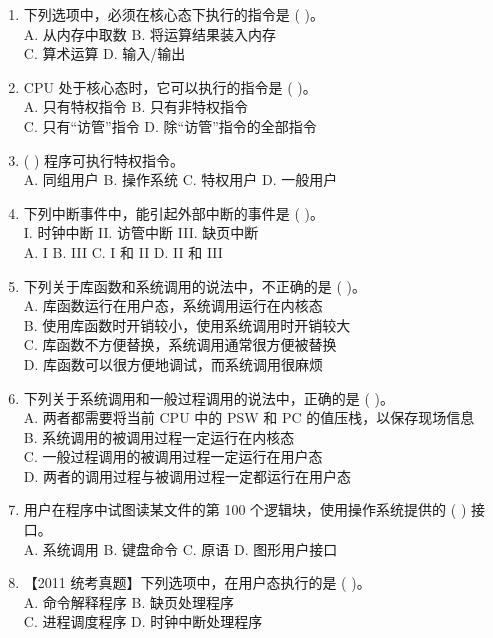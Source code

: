 \documentclass[lang=cn,newtx,10pt,scheme=chinese]{../../elegantbook}
\begin{document}
\begin{enumerate}
    \item 下列选项中，必须在核心态下执行的指令是 (    )。\\
    A. 从内存中取数 \quad B. 将运算结果装入内存\\
    C. 算术运算 \quad D. 输入/输出

    \item CPU 处于核心态时，它可以执行的指令是 (    )。\\
    A. 只有特权指令 \quad B. 只有非特权指令\\
    C. 只有“访管”指令 \quad D. 除“访管”指令的全部指令

    \item (    ) 程序可执行特权指令。\\
    A. 同组用户 \quad B. 操作系统 \quad C. 特权用户 \quad D. 一般用户

    \item 下列中断事件中，能引起外部中断的事件是 (    )。\\
    I. 时钟中断 \quad II. 访管中断 \quad III. 缺页中断\\
    A. I \quad B. III \quad C. I 和 II \quad D. II 和 III

    \item 下列关于库函数和系统调用的说法中，不正确的是 (    )。\\
    A. 库函数运行在用户态，系统调用运行在内核态\\
    B. 使用库函数时开销较小，使用系统调用时开销较大\\
    C. 库函数不方便替换，系统调用通常很方便被替换\\
    D. 库函数可以很方便地调试，而系统调用很麻烦

    \item 下列关于系统调用和一般过程调用的说法中，正确的是 (    )。\\
    A. 两者都需要将当前 CPU 中的 PSW 和 PC 的值压栈，以保存现场信息\\
    B. 系统调用的被调用过程一定运行在内核态\\
    C. 一般过程调用的被调用过程一定运行在用户态\\
    D. 两者的调用过程与被调用过程一定都运行在用户态

    \item 用户在程序中试图读某文件的第 100 个逻辑块，使用操作系统提供的 (    ) 接口。\\
    A. 系统调用 \quad B. 键盘命令 \quad C. 原语 \quad D. 图形用户接口

    \item 【2011 统考真题】下列选项中，在用户态执行的是 (    )。\\
    A. 命令解释程序 \quad B. 缺页处理程序\\
    C. 进程调度程序 \quad D. 时钟中断处理程序


\end{enumerate}
\end{document}

